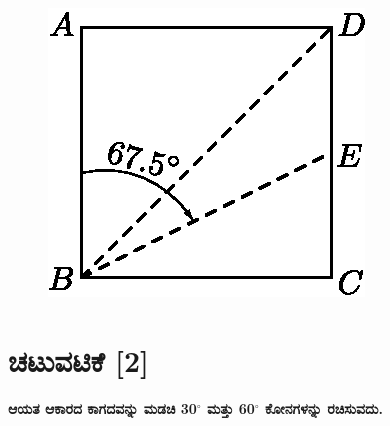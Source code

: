 \begin{figure}[H]
\centering
\includegraphics[scale=.98]{src/figure/chap1/fig1-7d.eps}
\end{figure}


\section*{ಚಟುವಟಿಕೆ [2]} \textbf{ಆಯತ ಆಕಾರದ ಕಾಗದವನ್ನು ಮಡಚಿ 30$^\circ$ ಮತ್ತು 60$^\circ$ ಕೋನಗಳನ್ನು ರಚಿಸುವದು.} 

